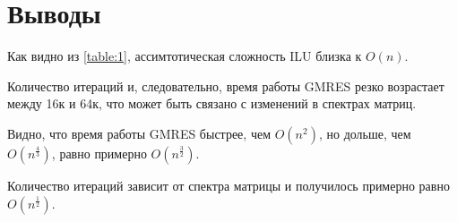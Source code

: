 	\section{Выводы}
	
	Как видно из \ref{table:1}, ассимтотическая сложность ILU близка к $O(n)$.
	
	Количество итераций и, следовательно, время работы GMRES резко возрастает между 16к и 64к, что может быть связано с изменений в спектрах матриц.
	
	Видно, что время работы GMRES быстрее, чем $O(n^2)$, но дольше, чем $O(n^{\frac{4}{3}})$, равно примерно $O(n^{\frac{3}{2}})$.
	
	Количество итераций зависит от спектра матрицы и получилось примерно равно $O(n^{\frac{1}{2}})$.
	
